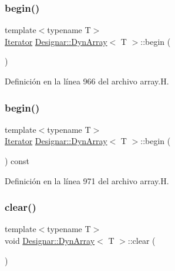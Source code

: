 \subsubsection{\texorpdfstring{begin()}{begin()}\hspace{0.1cm}{\footnotesize\ttfamily [1/2]}}
{\footnotesize\ttfamily template$<$typename T$>$ \\
\hyperlink{class_designar_1_1_dyn_array_1_1_iterator}{Iterator} \hyperlink{class_designar_1_1_dyn_array}{Designar\+::\+Dyn\+Array}$<$ T $>$\+::begin (\begin{DoxyParamCaption}{ }\end{DoxyParamCaption})\hspace{0.3cm}{\ttfamily [inline]}}



Definición en la línea 966 del archivo array.\+H.

\mbox{\label{class_designar_1_1_dyn_array_a36886c618a763286ec179f7fc7cffa68}} 
\subsubsection{\texorpdfstring{begin()}{begin()}\hspace{0.1cm}{\footnotesize\ttfamily [2/2]}}
{\footnotesize\ttfamily template$<$typename T$>$ \\
\hyperlink{class_designar_1_1_dyn_array_1_1_iterator}{Iterator} \hyperlink{class_designar_1_1_dyn_array}{Designar\+::\+Dyn\+Array}$<$ T $>$\+::begin (\begin{DoxyParamCaption}{ }\end{DoxyParamCaption}) const\hspace{0.3cm}{\ttfamily [inline]}}



Definición en la línea 971 del archivo array.\+H.

\mbox{\label{class_designar_1_1_dyn_array_abea6b41f8373dc60753255f3c390507f}} 
\subsubsection{\texorpdfstring{clear()}{clear()}}
{\footnotesize\ttfamily template$<$typename T$>$ \\
void \hyperlink{class_designar_1_1_dyn_array}{Designar\+::\+Dyn\+Array}$<$ T $>$\+::clear (\begin{DoxyParamCaption}{ }\end{DoxyParamCaption})\hspace{0.3cm}{\ttfamily [inline]}}



